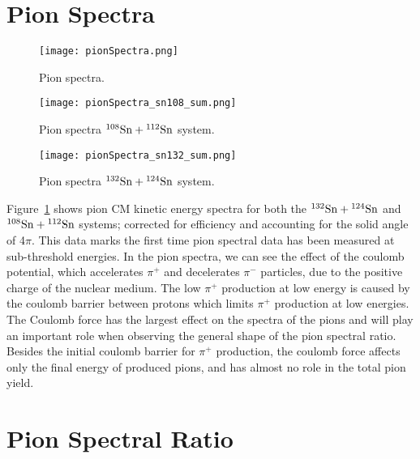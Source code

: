 \section{Pion Spectra}
\label{sec:pionSpectra}



\begin{figure}[!htb]
\centering
\texttt{[image: pionSpectra.png]}
\caption{Pion spectra. }
\label{fig:pionspectra}
\end{figure}


\begin{figure}[!htb]
\centering
\texttt{[image: pionSpectra\_sn108\_sum.png]}
\caption{Pion spectra ${}^{108}\mathrm{Sn} + {}^{112}\mathrm{Sn}$ system. }
\label{fig:pionspectraSn108}
\end{figure}


\begin{figure}[!htb]
\centering
\texttt{[image: pionSpectra\_sn132\_sum.png]}
\caption{Pion spectra ${}^{132}\mathrm{Sn} + {}^{124}\mathrm{Sn}$ system. }
\label{fig:pionspectraSn132}
\end{figure}


Figure~\ref{fig:pionspectra} shows pion CM kinetic energy spectra for both the ${}^{132}\mathrm{Sn} + {}^{124}\mathrm{Sn}$ and ${}^{108}\mathrm{Sn} + {}^{112}\mathrm{Sn}$ systems; corrected for efficiency and accounting for the solid angle of 4$\pi$. This data marks the first time pion spectral data has been measured at sub-threshold energies. In the pion spectra, we can see the effect of the coulomb potential, which accelerates $\pi^+$ and decelerates $\pi^-$ particles, due to the positive charge of the nuclear medium. The low $\pi^+$ production at low energy is caused by the coulomb barrier between protons which limits $\pi^+$ production at low energies. The Coulomb force has the largest effect on the spectra of the pions and will play an important role when observing the general shape of the pion spectral ratio. Besides the initial coulomb barrier for $\pi^+$ production, the coulomb force affects only the final energy of produced pions, and has almost no role in the total pion yield. 




\section{Pion Spectral Ratio}


